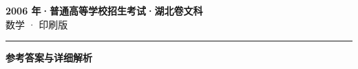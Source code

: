 \documentclass[zihao=5, a4paper]{ctexart}
\begin{document}
\begin{center}
  {\Large\bfseries 2006 年·普通高等学校招生考试·湖北卷文科}\\[4pt]
  {\large 数学 · 印刷版}
\end{center}
\medskip
{}

\par\bigskip\hrule\bigskip
{}
\begin{center}{\large\bfseries 参考答案与详细解析}\end{center}
\smallskip

\end{document}
